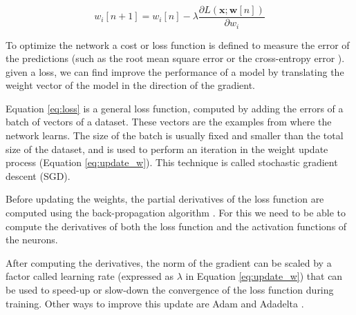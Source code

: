 \begin{equation}
    w_i[n+1] = w_i[n] - \lambda \frac{\partial L(\mathbf{x}; \mathbf{w}[n])}{\partial w_i}
    \label{eq:update_w}
\end{equation}

To optimize the network a cost or loss function is defined to measure the error of the predictions (such as the root mean square error or the cross-entropy error \cite{golik2013cross}). given a loss, we can find improve the performance of a model by translating the weight vector of the model in the direction of the gradient.

Equation \ref{eq:loss} is a general loss function, computed by adding the errors of a batch of vectors of a dataset. These vectors are the examples from where the network learns. The size of the batch is usually fixed and smaller than the total size of the dataset, and is used to perform an iteration in the weight update process (Equation \ref{eq:update_w}). This technique is called stochastic gradient descent \cite{bottou2010large} (SGD).

Before updating the weights, the partial derivatives of the loss function are computed using the back-propagation algorithm \cite{chauvin1995backpropagation}. For this we need to be able to compute the derivatives of both the loss function and the activation functions of the neurons.

After computing the derivatives, the norm of the gradient can be scaled by a factor called learning rate (expressed as $\lambda$ in Equation \ref{eq:update_w}) that can be used to speed-up or slow-down the convergence of the loss function during training. Other ways to improve this update are Adam \cite{kingma2014adam} and Adadelta \cite{zeiler2012adadelta}.



